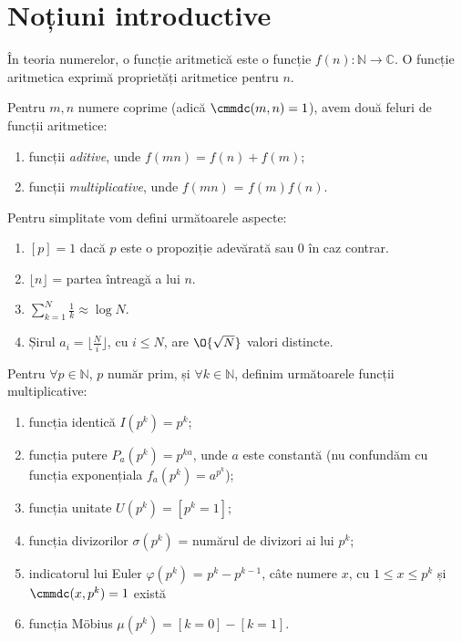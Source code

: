 
\section{Noțiuni introductive}

 În teoria numerelor, o funcție aritmetică este o funcție $f(n) : \mathbb{N} \to \mathbb{C}$. O funcție aritmetica exprimă proprietăți aritmetice pentru $n$.

Pentru $m, n$ numere coprime (adică $\cmmdc(m, n) = 1$), avem două feluri de funcții aritmetice:
\begin{enumerate}
    \item funcții \textit{aditive}, unde $f(mn) = f(n) + f(m)$;
    \item funcții \textit{multiplicative}, unde $f(mn)$ = $f(m)f(n)$.
\end{enumerate}
Pentru simplitate vom defini următoarele aspecte: 
\begin{enumerate}
    \item $[p] = 1$ dacă $p$ este o propoziție adevărată sau 0 în caz contrar.
    \item $\lfloor n \rfloor$ = partea întreagă a lui $n$.
    \item $\sum_{k = 1}^{N} \frac{1}{k} \approx \log{N}$.
    \item Șirul $ a_i = \lfloor \frac{N}{i} \rfloor $, cu $i \leq N$, are $\O{\sqrt N}$ valori distincte.
\end{enumerate}
Pentru $\forall p \in \mathbb{N}$, $p$ număr prim, și $\forall k \in \mathbb{N}$, definim următoarele funcții multiplicative:
\begin{enumerate}
    \item funcția identică $I(p^k) = p^k$;
    \item funcția putere $P_a(p^k) = p^{ka}$, unde $a$ este constantă (nu confundăm cu funcția exponențiala $f_a(p^k) = a^{p^k}$);
    \item funcția unitate $U(p^k) = [p^k = 1]$;
    \item funcția divizorilor $\sigma (p^k)$ = numărul de divizori ai lui $p^k$; 
    \item indicatorul lui Euler $\varphi(p^k) $ = $p^{k} - p^{k-1}$, câte numere $x$, cu $1 \leq x \leq p^k$ și $\cmmdc(x, p^k) = 1$ există 
    \item funcția Möbius $\mu(p^k) = [k = 0] - [k = 1]$.
\end{enumerate}

